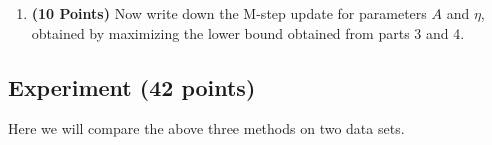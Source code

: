 \begin{enumerate}
\item \textbf{(10 Points)}
Now write down the M-step update for parameters $A$ and $\eta$, obtained
by maximizing the lower bound obtained from parts 3 and 4.



\end{enumerate}

 
\subsection{Experiment (42 points)}

Here we will compare the above three methods on two data sets. 

